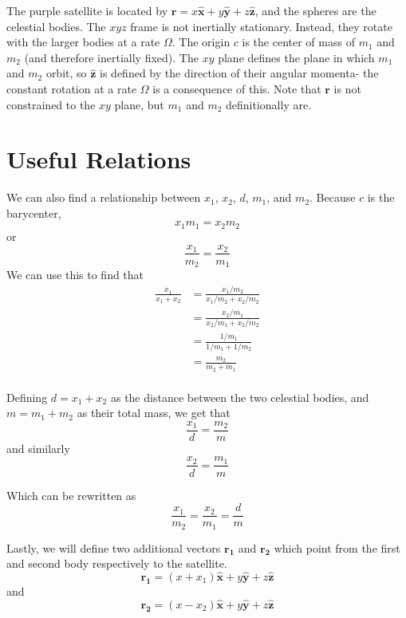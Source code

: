 \documentclass{article}
\newcommand{\vv}[1]{\bm{#1}}
\newcommand{\vh}[1]{\bm{\hat{#1}}}
\begin{document}
The purple satellite is located by $\vv{r}=x\vh{x}+y\vh{y}+z\vh{z}$, and the spheres are the celestial bodies. The $xyz$ frame is not inertially stationary. Instead, they rotate with the larger bodies at a rate $\Omega$. The origin $c$ is the center of mass of $m_1$ and $m_2$ (and therefore inertially fixed). The $xy$ plane defines the plane in which $m_1$ and $m_2$ orbit, so $\vh{z}$ is defined by the direction of their angular momenta- the constant rotation at a rate $\Omega$ is a consequence of this. Note that $\vv{r}$ is not constrained to the $xy$ plane, but $m_1$ and $m_2$ definitionally are. 

\section*{Useful Relations}

We can also find a relationship between $x_1$, $x_2$, $d$, $m_1$, and $m_2$. Because $c$ is the barycenter,
\[x_1m_1=x_2m_2\]
or
\[\frac{x_1}{m_2}=\frac{x_2}{m_1}\]
We can use this to find that
\[\begin{aligned}
\frac{x_1}{x_1+x_2}&=\frac{x_1/m_2}{x_1/m_2+x_2/m_2}\\
&=\frac{x_2/m_1}{x_2/m_1+x_2/m_2}\\
&=\frac{1/m_1}{1/m_1+1/m_2}\\
&=\frac{m_2}{m_2+m_1}\\
\end{aligned}\]

Defining $d=x_1+x_2$ as the distance between the two celestial bodies, and $m=m_1+m_2$ as their total mass, we get that
\[\boxed{\frac{x_1}{d}=\frac{m_2}{m}}\]
and similarly
\[\boxed{\frac{x_2}{d}=\frac{m_1}{m}}\]


Which can be rewritten as
\[\boxed{\frac{x_1}{m_2}=\frac{x_2}{m_1}=\frac{d}{m}}\]

Lastly, we will define two additional vectors $\vv{r_1}$ and $\vv{r_2}$ which point from the first and second body respectively to the satellite.
\[\vv{r_1}=\left(x+x_1\right)\vh{x}+y\vh{y}+z\vh{z}\]
and
\[\vv{r_2}=\left(x-x_2\right)\vh{x}+y\vh{y}+z\vh{z}\]
\end{document}
